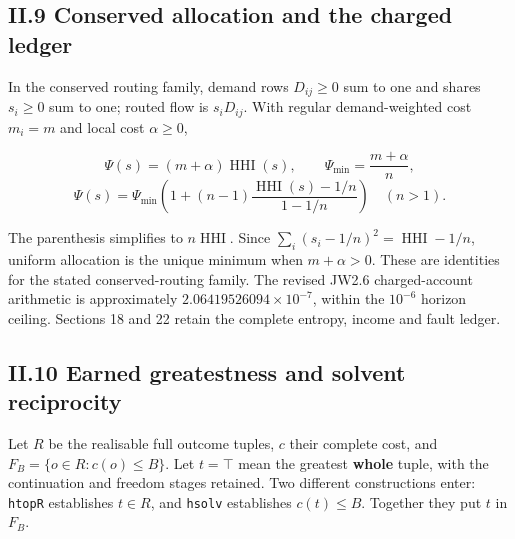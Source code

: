 \documentclass[
]{article}
\begin{document}
\subsection{II.9 Conserved allocation and the charged
ledger}\label{ii.9-conserved-allocation-and-the-charged-ledger}

In the conserved routing family, demand rows \(D_{ij}\ge0\) sum to one
and shares \(s_i\ge0\) sum to one; routed flow is \(s_iD_{ij}\). With
regular demand-weighted cost \(m_i=m\) and local cost \(\alpha\ge0\),

\[
\Psi(s)=(m+\alpha)\operatorname{HHI}(s),\qquad
\Psi_{\min}=\frac{m+\alpha}{n},
\] \[
\Psi(s)=\Psi_{\min}\left(1+(n-1)\frac{\operatorname{HHI}(s)-1/n}{1-1/n}\right)
\quad(n>1).
\]

The parenthesis simplifies to \(n\operatorname{HHI}\). Since
\(\sum_i(s_i-1/n)^2=\operatorname{HHI}-1/n\), uniform allocation is the
unique minimum when \(m+\alpha>0\). These are identities for the stated
conserved-routing family. The revised JW2.6 charged-account arithmetic
is approximately \(2.06419526094\times10^{-7}\), within the \(10^{-6}\)
horizon ceiling. Sections 18 and 22 retain the complete entropy, income
and fault ledger.

\subsection{II.10 Earned greatestness and solvent
reciprocity}\label{ii.10-earned-greatestness-and-solvent-reciprocity}

Let \(R\) be the realisable full outcome tuples, \(c\) their complete
cost, and \(F_B=\{o\in R:c(o)\le B\}\). Let \(t=\top\) mean the greatest
\textbf{whole} tuple, with the continuation and freedom stages retained.
Two different constructions enter: \texttt{htopR} establishes
\(t\in R\), and \texttt{hsolv} establishes \(c(t)\le B\). Together they
put \(t\) in \(F_B\).
\end{document}

